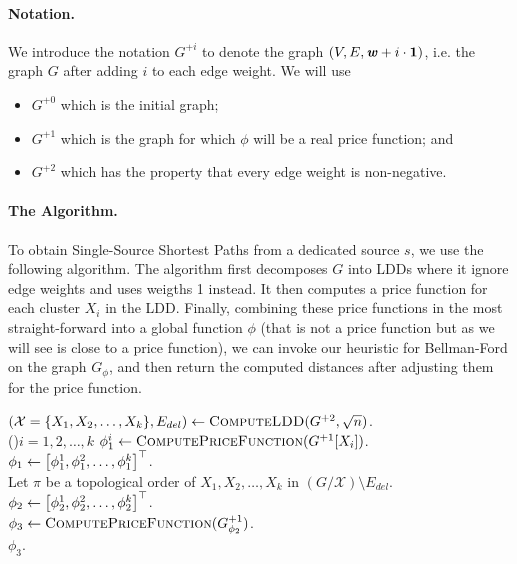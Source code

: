 \paragraph{Notation.} We introduce the notation $G^{+i}$ to denote the graph $(V, E, \boldsymbol{\mathit{w}} + i \cdot \boldsymbol{1})$, i.e. the graph $G$ after adding $i$ to each edge weight. We will use 
\begin{itemize}
    \item $G^{+0}$ which is the initial graph;
    \item $G^{+1}$ which is the graph for which $\phi$ will be a real price function; and
    \item $G^{+2}$ which has the property that every edge weight is non-negative.
\end{itemize}  

\paragraph{The Algorithm.} To obtain Single-Source Shortest Paths from a dedicated source $s$, we use the following algorithm. The algorithm first decomposes $G$ into LDDs where it ignore edge weights and uses weigths 1 instead. It then computes a price function for each cluster $X_i$ in the LDD. Finally, combining these price functions in the most straight-forward into a global function $\phi$ (that is not a price function but as we will see is close to a price function), we can invoke our heuristic for Bellman-Ford on the graph $G_{\phi}$, and then return the computed distances after adjusting them for the price function.

\begin{algorithm}
$(\mathcal{X} = \{X_1, X_2, \ldots, X_k\}, E_{del}) \gets \textsc{ComputeLDD}(G^{+2}, \sqrt{n})$.\\

\lFor(\label{lne:priceFunInvocClusters}){$i = 1, 2, \ldots, k$}{
	$\phi_1^i \gets \textsc{ComputePriceFunction}(G^{+1}[X_i])$.
}
$\phi_1 \gets \left[ \phi_1^1 , \phi_1^2 , \ldots,  \phi_1^k \right]^{\top}$.\\

Let $\pi$ be a topological order of $X_1, X_2, \ldots, X_k$ in $(G/ \mathcal{X}) \setminus E_{del}$.\\
$\phi_2 \gets \left[ \phi_2^1 , \phi_2^2 , \ldots,  \phi_2^k \right]^{\top}$.\\

$\phi_3 \gets  \textsc{ComputePriceFunction}(G^{+1}_{\phi_2})$.\label{lne:computePriceOnNegBackEdges}\\
\Return $\phi_3$.
\caption{$\textsc{PriceFunctionOnNormalizedGraph}(G = (V, E,\ww))$}
\label{alg:negSSSPEasy}
\end{algorithm}

